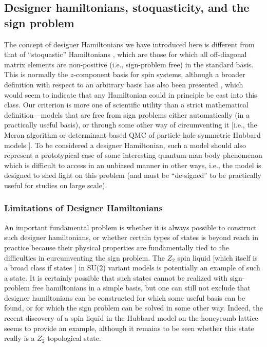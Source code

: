 \documentclass[range]{ar2e}
\begin{document}
\subsection{Designer hamiltonians, stoquasticity, and the sign problem}

The concept of designer Hamiltonians we have introduced here is different from that of ``stoquastic'' Hamiltonians \cite{Terhal08}, which are
those for which all off-diagonal matrix elements are non-positive (i.e., sign-problem free) in the standard basis.  This is normally the  $z$-component 
basis for spin systems, although a broader definition with respect to an arbitrary basis has also been presented \cite{Terhal09}, which would seem to 
indicate that any Hamiltonian could in principle be cast into this class. Our criterion is more one of scientific utility than a strict mathematical 
definition---models that are free from sign problems either automatically (in a practically useful basis), or through some 
other way of circumventing it [i.e., the Meron algorithm \cite{Chandrasekharan99} or determinant-based QMC of particle-hole symmetric Hubbard 
models \cite{White89,Assaad05,Assaad07}]. To be considered a designer Hamiltonian, such a model should also represent a prototypical case of 
some interesting quantum-man body phenomenon which is difficult to access in an unbiased manner in other ways, i.e., the model is designed to shed
light on this problem (and must be ``de-signed'' to be practically useful for studies on large scale).

\subsubsection{Limitations of Designer Hamiltonians}

An important fundamental problem is whether it is always possible to construct such designer hamiltonians, or whether certain types of 
states is beyond reach in practice because their physical properties are fundamentally tied to the difficulties in curcumventing the sign problem. 
The $Z_2$ spin liquid [which itself is a broad class if states \cite{Wen03}] in SU($2$) variant models is potentially an example of such a state. 
It is certainly possible that such states cannot be realized with sign-problem free hamiltonians in a simple basis, but one can still not exclude that 
designer hamiltonians can be constructed for which some useful basis can be found, or for which the sign problem can be solved in some other way.
Indeed, the recent discovery of a spin liquid in the Hubbard model on the honeycomb lattice \cite{Meng10} seems to provide an example, although it 
remains to be seen whether this state really is a $Z_2$ topological state.
\end{document}
